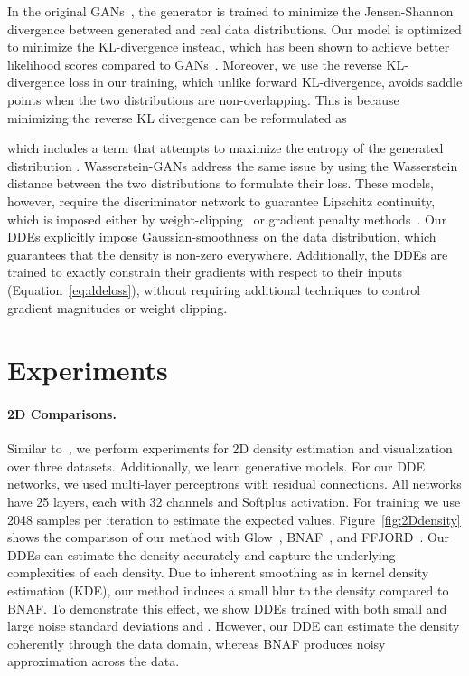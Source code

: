 \documentclass{article}
\begin{document}
In the original GANs~\citep{Goodfellow2014GAN}, the generator is trained to minimize the Jensen-Shannon divergence between generated and real data distributions.
Our model is optimized to minimize the KL-divergence instead, which has been shown to achieve better likelihood scores compared to GANs~\citep{nowozin2016f}.
Moreover, we use the reverse KL-divergence loss in our training, which unlike forward KL-divergence, avoids saddle points when the two distributions are non-overlapping. This is because minimizing the reverse KL divergence can be reformulated as

which includes a term that attempts to maximize the entropy  of the generated distribution .
Wasserstein-GANs address the same issue by using the Wasserstein distance between the two distributions to formulate their loss.
These models, however, require the discriminator network to guarantee Lipschitz continuity, which is imposed either by weight-clipping~\cite{arjovsky2017wasserstein} or gradient penalty methods~\citep{gulrajani2017improved}.
Our DDEs explicitly impose Gaussian-smoothness on the data distribution, which guarantees that the density is non-zero everywhere.
Additionally, the DDEs are trained to exactly constrain their gradients with respect to their inputs (Equation~\ref{eq:ddeloss}), without requiring additional techniques to control gradient magnitudes or weight clipping.











\section{Experiments}

\paragraph{2D Comparisons.}



Similar to~\citet{grathwohl2019ffjord}, we perform experiments for 2D density estimation and visualization over three datasets.
Additionally, we learn generative models. For our DDE networks, we used multi-layer perceptrons with residual connections. All networks have 25 layers, each with 32 channels and Softplus activation. For training we use 2048 samples per iteration to estimate the expected values.
Figure~\ref{fig:2Ddensity} shows the comparison of our method with Glow~\citep{Kingma2018GLOW}, BNAF~\citep{de2019block}, and FFJORD~\citep{grathwohl2019ffjord}.
Our DDEs can estimate the density accurately and capture the underlying complexities of each density.
Due to inherent smoothing as in kernel density estimation (KDE), our method induces a small blur to the density compared to BNAF. To demonstrate this effect, we show DDEs trained with both small and large noise standard deviations  and .
However, our DDE can estimate the density coherently through the data domain, whereas BNAF produces noisy approximation across the data.
\end{document}
